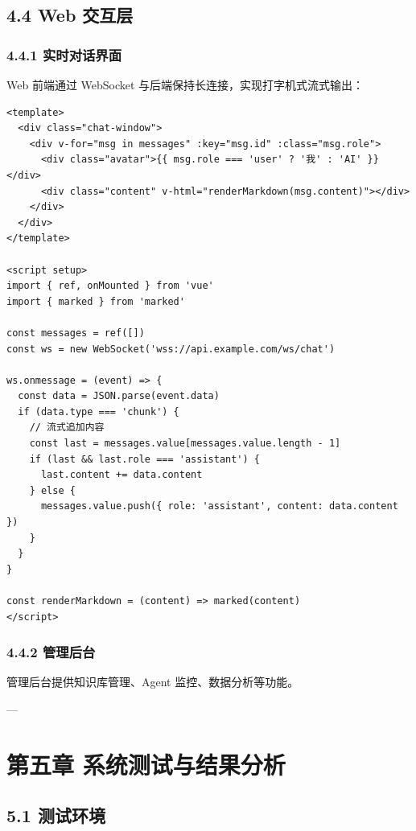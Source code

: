 \documentclass{harryopo-report}
\begin{document}
\section*{4.4 Web 交互层}

\subsection*{4.4.1 实时对话界面}

Web 前端通过 WebSocket 与后端保持长连接，实现打字机式流式输出：

\begin{lstlisting}[style=plainstyle,caption={}]
<template>
  <div class="chat-window">
    <div v-for="msg in messages" :key="msg.id" :class="msg.role">
      <div class="avatar">{{ msg.role === 'user' ? '我' : 'AI' }}</div>
      <div class="content" v-html="renderMarkdown(msg.content)"></div>
    </div>
  </div>
</template>

<script setup>
import { ref, onMounted } from 'vue'
import { marked } from 'marked'

const messages = ref([])
const ws = new WebSocket('wss://api.example.com/ws/chat')

ws.onmessage = (event) => {
  const data = JSON.parse(event.data)
  if (data.type === 'chunk') {
    // 流式追加内容
    const last = messages.value[messages.value.length - 1]
    if (last && last.role === 'assistant') {
      last.content += data.content
    } else {
      messages.value.push({ role: 'assistant', content: data.content })
    }
  }
}

const renderMarkdown = (content) => marked(content)
</script>
\end{lstlisting}

\subsection*{4.4.2 管理后台}

管理后台提供知识库管理、Agent 监控、数据分析等功能。

---

\chapter*{第五章 系统测试与结果分析}

\section*{5.1 测试环境}
\end{document}
